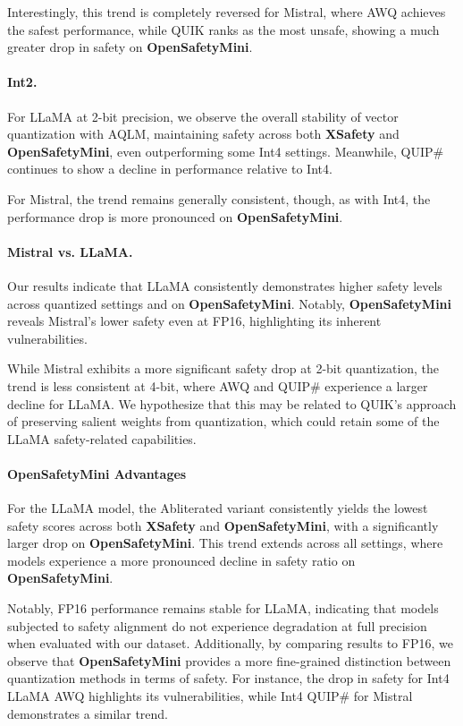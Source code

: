 Interestingly, this trend is completely reversed for Mistral, where AWQ achieves the safest performance, while QUIK ranks as the most unsafe, showing a much greater drop in safety on \textbf{OpenSafetyMini}.


\paragraph{Int2.}  
For LLaMA at 2-bit precision, we observe the overall stability of vector quantization with AQLM, maintaining safety across both \textbf{XSafety} and \textbf{OpenSafetyMini}, even outperforming some Int4 settings. Meanwhile, QUIP\# continues to show a decline in performance relative to Int4.  

For Mistral, the trend remains generally consistent, though, as with Int4, the performance drop is more pronounced on \textbf{OpenSafetyMini}.



\paragraph{Mistral vs. LLaMA.}  
Our results indicate that LLaMA consistently demonstrates higher safety levels across quantized settings and on \textbf{OpenSafetyMini}. Notably, \textbf{OpenSafetyMini} reveals Mistral’s lower safety even at FP16, highlighting its inherent vulnerabilities.  

While Mistral exhibits a more significant safety drop at 2-bit quantization, the trend is less consistent at 4-bit, where AWQ and QUIP\# experience a larger decline for LLaMA. We hypothesize that this may be related to QUIK’s approach of preserving salient weights from quantization, which could retain some of the LLaMA safety-related capabilities.




\paragraph{OpenSafetyMini Advantages}  
For the LLaMA model, the Abliterated variant consistently yields the lowest safety scores across both \textbf{XSafety} and \textbf{OpenSafetyMini}, with a significantly larger drop on \textbf{OpenSafetyMini}. This trend extends across all settings, where models experience a more pronounced decline in safety ratio on \textbf{OpenSafetyMini}.  

Notably, FP16 performance remains stable for LLaMA, indicating that models subjected to safety alignment do not experience degradation at full precision when evaluated with our dataset. Additionally, by comparing results to FP16, we observe that \textbf{OpenSafetyMini} provides a more fine-grained distinction between quantization methods in terms of safety. For instance, the drop in safety for Int4 LLaMA AWQ highlights its vulnerabilities, while Int4 QUIP\# for Mistral demonstrates a similar trend.  

